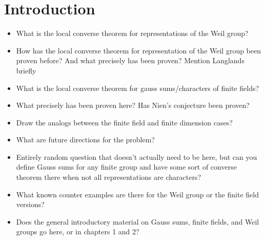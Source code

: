 \chapter{Introduction}	%
\begin{itemize}

\item What is the local converse theorem for representations of the Weil group?
\item How has the local converse theorem for representation of the Weil group been proven before? And what precisely has been proven? Mention Langlands briefly
\item What is the local converse theorem for gauss sums/characters of finite fields?
\item What precisely has been proven here? Has Nien's conjecture been proven?
\item Draw the analogs between the finite field and finite dimension cases?
\item What are future directions for the problem?
\item Entirely random question that doesn't actually need to be here, but can you define Gauss sums for any finite group and have some sort of converse theorem there when not all representations are characters?
\item What known counter examples are there for the Weil group or the finite field versions?
\item Does the general introductory material on Gauss sums, finite fields, and Weil groups go here, or in chapters 1 and 2?

\end{itemize}
\endinput